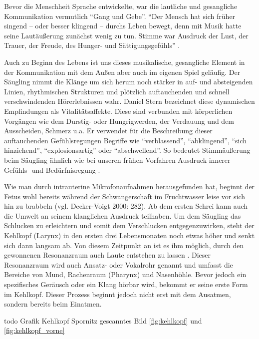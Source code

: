 Bevor die Menschheit Sprache entwickelte, war die lautliche und gesangliche Kommunikation vermutlich "`Gang und Gebe"'. "`Der Mensch hat sich früher singend – oder besser klingend – durchs Leben bewegt, denn mit Musik hatte seine Lautäußerung zunächst wenig zu tun. Stimme war Ausdruck der Lust, der Trauer, der Freude, des Hunger- und Sättigungsgefühls"' \autocite[8]{cramer1998}.

Auch zu Beginn des Lebens ist uns dieses musikalische, gesangliche Element in der Kommunikation mit dem Außen aber auch im eigenen Spiel geläufig. Der Säugling nimmt die Klänge um sich herum noch stärker in auf- und absteigenden Linien, rhythmischen Strukturen und plötzlich auftauchenden und schnell verschwindenden Hörerlebnissen wahr. Daniel Stern bezeichnet diese dynamischen Empfindungen als Vitalitätsaffekte. Diese sind verbunden mit körperlichen Vorgängen wie dem Durstig- oder Hungrigwerden, der Verdauung und dem Ausscheiden, Schmerz u.a. Er verwendet für die Beschreibung dieser auftauchenden Gefühlsregungen Begriffe wie "`verblassend"', "`abklingend"', "`sich hinziehend"', "`explosionsartig"' oder "`abschwellend"'.
So bedeutet Stimmäußerung beim Säugling ähnlich wie bei unseren frühen Vorfahren Ausdruck innerer Gefühls- und Bedürfnisregung \autocite[vgl.][83]{stern2007}. 

Wie man durch intrauterine Mikrofonaufnahmen herausgefunden hat, beginnt der Fetus wohl bereits während der Schwangerschaft im Fruchtwasser leise vor sich hin zu brabbeln (vgl. Decker-Voigt 2000: 282). Ab dem ersten Schrei kann auch die Umwelt an seinem klanglichen Ausdruck teilhaben. Um dem Säugling das Schlucken zu erleichtern und somit dem Verschlucken entgegenzuwirken, steht der Kehlkopf (Larynx) in den ersten drei Lebensmonaten noch etwas höher und senkt sich dann langsam ab. Von diesem Zeitpunkt an ist es ihm möglich, durch den gewonnenen Resonanzraum auch Laute entstehen zu lassen \autocite[vgl.][36]{cramer1998}. Dieser Resonanzraum wird auch Ansatz- oder Vokalrohr genannt und umfasst die Bereiche von Mund, Rachenraum (Pharynx) und Nasenhöhle. Bevor jedoch ein spezifisches Geräusch oder ein Klang hörbar wird, bekommt er seine erste Form im Kehlkopf. Dieser Prozess beginnt jedoch nicht erst mit dem Ausatmen, sondern bereits beim Einatmen. 

todo Grafik Kehlkopf Spornitz gescanntes Bild \ref{fig:kehlkopf} und \ref{fig:kehlkopf_vorne}

